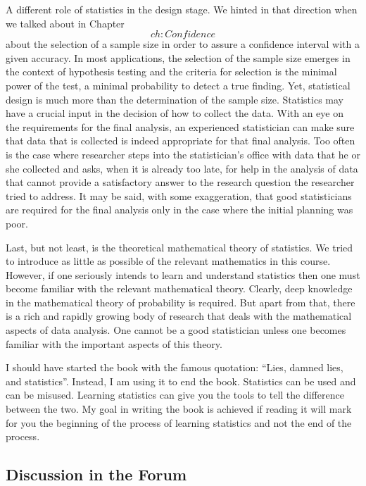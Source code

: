 \documentclass[]{krantz}
\theoremstyle{definition}
\theoremstyle{definition}
\theoremstyle{definition}
\theoremstyle{remark}
\begin{document}
A different role of statistics in the design stage. We hinted in that
direction when we talked about in Chapter~\[ch:Confidence\] about the
selection of a sample size in order to assure a confidence interval with
a given accuracy. In most applications, the selection of the sample size
emerges in the context of hypothesis testing and the criteria for
selection is the minimal power of the test, a minimal probability to
detect a true finding. Yet, statistical design is much more than the
determination of the sample size. Statistics may have a crucial input in
the decision of how to collect the data. With an eye on the requirements
for the final analysis, an experienced statistician can make sure that
data that is collected is indeed appropriate for that final analysis.
Too often is the case where researcher steps into the statistician's
office with data that he or she collected and asks, when it is already
too late, for help in the analysis of data that cannot provide a
satisfactory answer to the research question the researcher tried to
address. It may be said, with some exaggeration, that good statisticians
are required for the final analysis only in the case where the initial
planning was poor.

Last, but not least, is the theoretical mathematical theory of
statistics. We tried to introduce as little as possible of the relevant
mathematics in this course. However, if one seriously intends to learn
and understand statistics then one must become familiar with the
relevant mathematical theory. Clearly, deep knowledge in the
mathematical theory of probability is required. But apart from that,
there is a rich and rapidly growing body of research that deals with the
mathematical aspects of data analysis. One cannot be a good statistician
unless one becomes familiar with the important aspects of this theory.

I should have started the book with the famous quotation: ``Lies, damned
lies, and statistics''. Instead, I am using it to end the book.
Statistics can be used and can be misused. Learning statistics can give
you the tools to tell the difference between the two. My goal in writing
the book is achieved if reading it will mark for you the beginning of
the process of learning statistics and not the end of the process.

\subsection{Discussion in the Forum}\label{discussion-in-the-forum}
\end{document}
